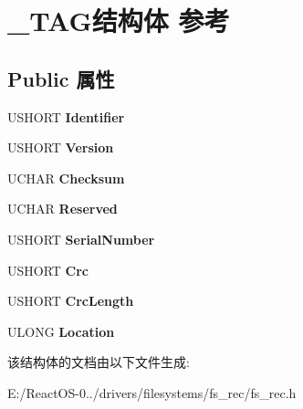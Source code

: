 \hypertarget{struct___t_a_g}{}\section{\+\_\+\+T\+A\+G结构体 参考}
\label{struct___t_a_g}
\subsection*{Public 属性}
\begin{DoxyCompactItemize}
\item 
\mbox{\label{struct___t_a_g_a12f8246e435ad95bd666a5b0ad2a07d2}} 
U\+S\+H\+O\+RT {\bfseries Identifier}
\item 
\mbox{\label{struct___t_a_g_a4c0fc3c1e24f5d5175f3da89ee1c05a2}} 
U\+S\+H\+O\+RT {\bfseries Version}
\item 
\mbox{\label{struct___t_a_g_a40905bd2caabd87cb18370b484fb9b1f}} 
U\+C\+H\+AR {\bfseries Checksum}
\item 
\mbox{\label{struct___t_a_g_ad14bcab9bd60d52b6d20a43c624bf927}} 
U\+C\+H\+AR {\bfseries Reserved}
\item 
\mbox{\label{struct___t_a_g_a846a3b04b27e2d0ba5f44d8337af7307}} 
U\+S\+H\+O\+RT {\bfseries Serial\+Number}
\item 
\mbox{\label{struct___t_a_g_a8bb6525178bfe694ba68d5f258f789ee}} 
U\+S\+H\+O\+RT {\bfseries Crc}
\item 
\mbox{\label{struct___t_a_g_a4db658fc40982f52af909077f1b0c809}} 
U\+S\+H\+O\+RT {\bfseries Crc\+Length}
\item 
\mbox{\label{struct___t_a_g_aa7e95331e098ab0fda6cdf421e7b8c65}} 
U\+L\+O\+NG {\bfseries Location}
\end{DoxyCompactItemize}


该结构体的文档由以下文件生成\+:\begin{DoxyCompactItemize}
\item 
E\+:/\+React\+O\+S-\/0../drivers/filesystems/fs\+\_\+rec/fs\+\_\+rec.\+h\end{DoxyCompactItemize}

